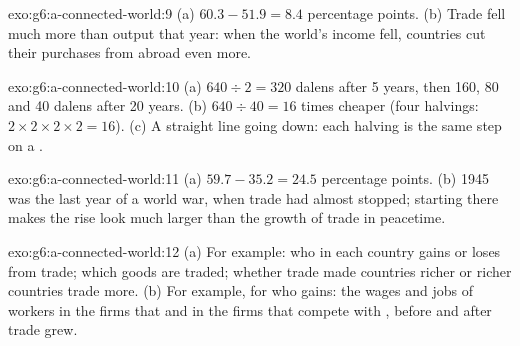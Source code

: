 \begin{solution}{exo:g6:a-connected-world:9}
(a) $60.3 - 51.9 = 8.4$ percentage points. (b) Trade fell much more than output that
year: when the world's income fell, countries cut their purchases from abroad even
more.
\end{solution}

\begin{solution}{exo:g6:a-connected-world:10}
(a) $640 \div 2 = 320$ dalens after 5 years, then 160, 80 and 40 dalens after 20
years. (b) $640 \div 40 = 16$ times cheaper (four halvings: $2 \times 2 \times 2 \times
2 = 16$). (c) A straight line going down: each halving is the same step on a
.
\end{solution}

\begin{solution}{exo:g6:a-connected-world:11}
(a) $59.7 - 35.2 = 24.5$ percentage points. (b) 1945 was the last year of a world war,
when trade had almost stopped; starting there makes the rise look much larger than
the growth of trade in peacetime.
\end{solution}

\begin{solution}{exo:g6:a-connected-world:12}
(a) For example: who in each country gains or loses from trade; which goods are
traded; whether trade made countries richer or richer countries trade more.
(b) For example, for who gains: the wages and jobs of workers in the firms that
 and in the firms that compete with , before and after trade grew.
\end{solution}

